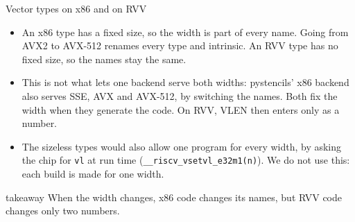 \documentclass[aspectratio=169,10pt,t]{beamer}
\newcommand{\code}[1]{\texttt{#1}}
\newcommand{\takeaway}[1]{\par\vfill
  \begin{beamercolorbox}[wd=\textwidth,sep=4pt,rounded=true]{takeaway}
    \small #1
  \end{beamercolorbox}}
\begin{document}
\begin{frame}{Vector types on x86 and on RVV}
  \vspace{1mm}
  \centering\resizebox{\textwidth}{!}{}

  \vspace{2mm}
  \raggedright
  \begin{itemize}\footnotesize
    \item An x86 type has a fixed size, so the width is part of every name. Going from AVX2 to AVX-512 renames
          every type and intrinsic. An RVV type has no fixed size, so the names stay the same.
    \item This is not what lets one backend serve both widths: pystencils' x86 backend also serves SSE, AVX and
          AVX-512, by switching the names. Both fix the width when they generate the code. On RVV, VLEN then
          enters only as a number.
    \item The sizeless types would also allow one program for every width, by asking the chip for \code{vl} at
          run time (\code{\_\_riscv\_vsetvl\_e32m1(n)}). We do not use this: each build is made for one width.
  \end{itemize}
  \takeaway{When the width changes, x86 code changes its names, but RVV code changes only two numbers.}
\end{frame}
\end{document}
